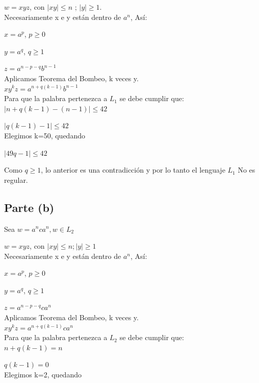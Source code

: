 \documentclass[11pt,letterpaper]{article}
\begin{document}
$w = xyz$, con $|xy| \leqslant n$ ; $|y|\geqslant 1$.
 \\

Necesariamente x e y están dentro de $a^n$, Así:

$x = a^p$, $p \geqslant 0$

$y = a^q$, $q\geqslant 1$

$z = a^{n-p-q}b^{n-1}$
 \\

Aplicamos Teorema del Bombeo, k veces y.
 \\
 
$xy^kz = a^{n+q(k-1)}b^{n-1}$
 \\

Para que la palabra pertenezca a $L_{1}$ se debe cumplir que:
 \\
 
$|n+q(k-1) - (n-1)| \leqslant 42$

$|q(k-1) -1| \leqslant 42$
 \\
 
Elegimos k=50, quedando

$|49q - 1| \leqslant 42$

Como $q \geqslant 1$, lo anterior es una contradicción y por lo tanto el lenguaje $L_{1}$ No es regular.


\subsection{Parte (b)}
Sea $w = a^nca^n, w \in  L_{2}$

$w = xyz$, con $|xy| \leqslant n ; |y| \geqslant 1$
 \\

Necesariamente x e y están dentro de $a^n$, Así:

$x = a^p$, $p \geqslant 0$

$y = a^q$, $q \geqslant 1$

$z = a^{n-p-q}ca^n$
 \\

Aplicamos Teorema del Bombeo, k veces y.
 \\
 
$xy^kz = a^{n+q(k-1)}ca^n$
 \\

Para que la palabra pertenezca a $L_{2}$ se debe cumplir que:
 \\
 
$n+q(k-1) = n$

$q(k-1) = 0$
 \\
 
Elegimos k=2, quedando
\end{document}
